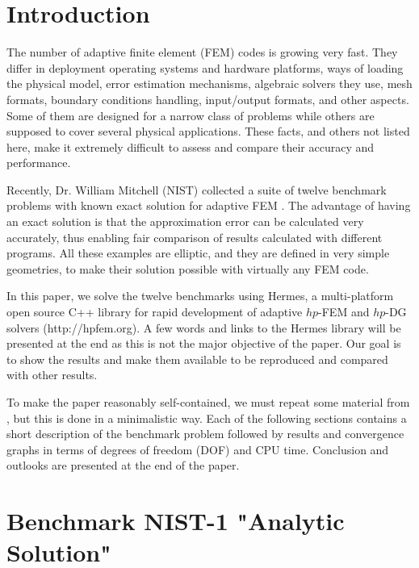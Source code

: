 \documentclass[12pt]{elsarticle}
\begin{document}
\section{Introduction}
\label{sec:intro}

The number of adaptive finite element (FEM) codes is growing very fast.
They differ in deployment operating systems and hardware platforms,
ways of loading the physical model, error estimation mechanisms,
algebraic solvers they use, mesh formats, boundary conditions
handling, input/output formats, and other aspects. Some of them are
designed for a narrow class of problems while others are supposed to
cover several physical applications. These facts, and others not listed
here, make it extremely difficult to assess and compare their accuracy and performance.

Recently, Dr. William Mitchell (NIST) collected a suite of
twelve benchmark problems with known exact solution for adaptive
FEM \cite{mitchell-1}. The advantage of having an exact solution is that
the approximation error can be calculated very accurately, thus
enabling fair comparison of results calculated with different
programs. All these examples are elliptic, and they are defined
in very simple geometries, to make their solution possible with
virtually any FEM code.

In this paper, we solve the twelve benchmarks using
Hermes, a multi-platform open source C++
library for rapid development of adaptive $hp$-FEM
and $hp$-DG solvers (http://hpfem.org). A few words
and links to the Hermes library will be presented at the
end as this is not the major objective of the paper.
Our goal is to show the results and make them available
to be reproduced and compared with other results.

To make the paper reasonably self-contained, we must repeat some
material from \cite{mitchell-1}, but this is done in a minimalistic way.
Each of the following sections contains a short description of
the benchmark problem followed by results and convergence graphs in terms of degrees
of freedom (DOF) and CPU time. Conclusion and outlooks
are presented at the end of the paper.


\section{Benchmark NIST-1 "Analytic Solution"}
\label{sec:bench-1}
\end{document}
